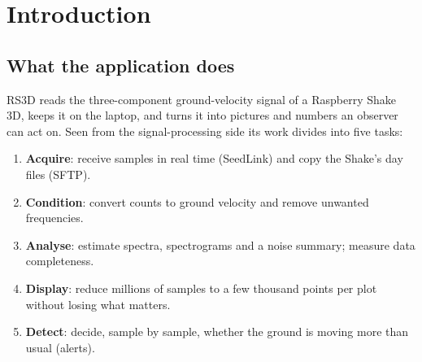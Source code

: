 \chapter{Introduction}\label{ch:intro}

\section{What the application does}
RS3D reads the three-component ground-velocity signal of a Raspberry Shake 3D, keeps it on the laptop, and turns it
into pictures and numbers an observer can act on. Seen from the signal-processing side its work divides into five
tasks:

\begin{enumerate}
\item \textbf{Acquire}: receive samples in real time (SeedLink) and copy the Shake's day files (SFTP).
\item \textbf{Condition}: convert counts to ground velocity and remove unwanted frequencies.
\item \textbf{Analyse}: estimate spectra, spectrograms and a noise summary; measure data completeness.
\item \textbf{Display}: reduce millions of samples to a few thousand points per plot without losing what matters.
\item \textbf{Detect}: decide, sample by sample, whether the ground is moving more than usual (alerts).
\end{enumerate}

